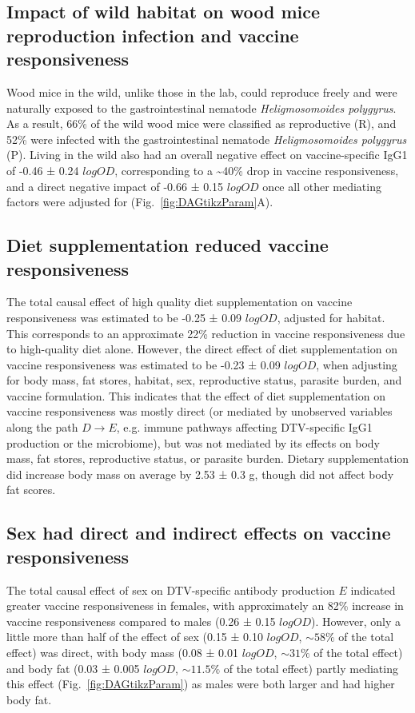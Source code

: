 \documentclass[a4paper, hidelinks, 11pt]{article}
\begin{document}
\subsection{Impact of wild habitat on wood mice reproduction infection and vaccine responsiveness}

Wood mice in the wild, unlike those in the lab, could reproduce freely and were naturally exposed to the gastrointestinal nematode \textit{Heligmosomoides polygyrus}. As a result, 66\% of the wild wood mice were classified as reproductive (R), and 52\% were infected with the gastrointestinal nematode \textit{Heligmosomoides polygyrus} (P). Living in the wild also had an overall negative effect on vaccine-specific IgG1 of -0.46 ± 0.24 $logOD$, corresponding to a \sim 40\% drop in vaccine responsiveness, and a direct negative impact of -0.66 ± 0.15 $logOD$ once all other mediating factors were adjusted for (Fig.~\ref{fig:DAGtikzParam}A).


\subsection{Diet supplementation reduced vaccine responsiveness}

The total causal effect of high quality diet supplementation on vaccine responsiveness was estimated to be -0.25 ± 0.09 $logOD$, adjusted for habitat. This corresponds to an approximate 22\% reduction in vaccine responsiveness due to high-quality diet alone. However, the direct effect of diet supplementation on vaccine responsiveness was estimated to be -0.23 ± 0.09 $logOD$, when adjusting for body mass, fat stores, habitat, sex, reproductive status, parasite burden, and vaccine formulation. This indicates that the effect of diet supplementation on vaccine responsiveness was mostly direct (or mediated by unobserved variables along the path $D \rightarrow E$, e.g. immune pathways affecting DTV-specific IgG1 production or the microbiome), but was not mediated by its effects on body mass, fat stores, reproductive status, or parasite burden. Dietary supplementation did increase body mass on average by 2.53 ± 0.3 g, though did not affect body fat scores.

\subsection{Sex had direct and indirect effects on vaccine responsiveness}

The total causal effect of sex on DTV-specific antibody production $E$ indicated greater vaccine responsiveness in females, with approximately an 82\% increase in vaccine responsiveness compared to males (0.26 ± 0.15 $logOD$). However, only a little more than half of the effect of sex (0.15 ± 0.10 $logOD$, $\sim 58\%$ of the total effect) was direct, with body mass (0.08 ± 0.01 $logOD$, $\sim 31\%$ of the total effect) and body fat (0.03 ± 0.005 $logOD$, $\sim 11.5\%$ of the total effect) partly mediating this effect (Fig.~\ref{fig:DAGtikzParam}) as males were both larger and had higher body fat.
\end{document}
